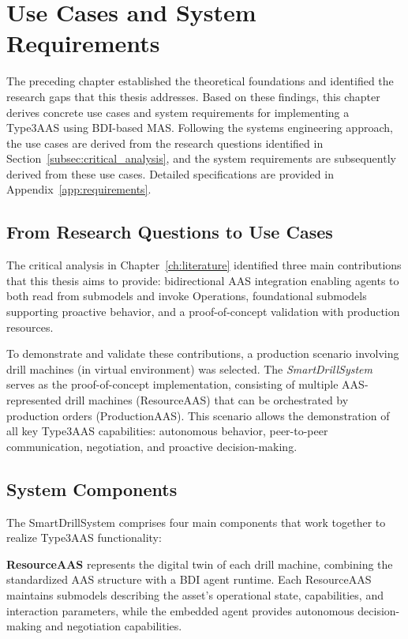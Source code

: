 \chapter{Use Cases and System Requirements}
\label{ch:requirements}

The preceding chapter established the theoretical foundations and identified the research gaps that this thesis addresses. Based on these findings, this chapter derives concrete use cases and system requirements for implementing a \ac{Type3AAS} using \ac{BDI}-based \ac{MAS}. Following the systems engineering approach, the use cases are derived from the research questions identified in Section~\ref{subsec:critical_analysis}, and the system requirements are subsequently derived from these use cases. Detailed specifications are provided in Appendix~\ref{app:requirements}.

\section{From Research Questions to Use Cases}
\label{sec:rq_to_uc}

The critical analysis in Chapter~\ref{ch:literature} identified three main contributions that this thesis aims to provide: bidirectional \ac{AAS} integration enabling agents to both read from submodels and invoke Operations, foundational submodels supporting proactive behavior, and a proof-of-concept validation with production resources.

To demonstrate and validate these contributions, a production scenario involving drill machines (in virtual environment) was selected. The \textit{SmartDrillSystem} serves as the proof-of-concept implementation, consisting of multiple \ac{AAS}-represented drill machines (ResourceAAS) that can be orchestrated by production orders (ProductionAAS). This scenario allows the demonstration of all key \ac{Type3AAS} capabilities: autonomous behavior, peer-to-peer communication, negotiation, and proactive decision-making.

\section{System Components}
\label{sec:system_components}

The SmartDrillSystem comprises four main components that work together to realize \ac{Type3AAS} functionality:

\textbf{ResourceAAS} represents the digital twin of each drill machine, combining the standardized \ac{AAS} structure with a \ac{BDI} agent runtime. Each ResourceAAS maintains submodels describing the asset's operational state, capabilities, and interaction parameters, while the embedded agent provides autonomous decision-making and negotiation capabilities.

